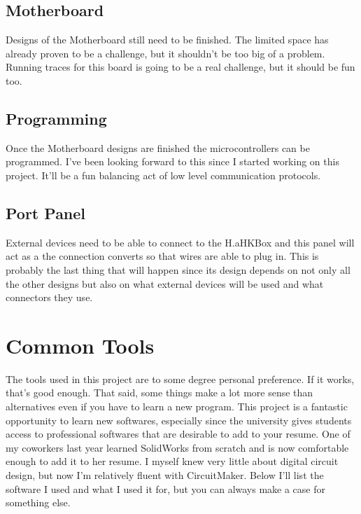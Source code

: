 \documentclass[prb,preprint]{revtex4-1}
\begin{document}
\subsection{Motherboard}
Designs of the Motherboard still need to be finished. The limited space has already proven to be a challenge, but it shouldn't be too big of a problem. Running traces for this board is going to be a real challenge, but it should be fun too.

\subsection{Programming}
Once the Motherboard designs are finished the microcontrollers can be programmed. I've been looking forward to this since I started working on this project. It'll be a fun balancing act of low level communication protocols.

\subsection{Port Panel}
External devices need to be able to connect to the H.aHKBox and this panel will act as a the connection converts so that wires are able to plug in. This is probably the last thing that will happen since its design depends on not only all the other designs but also on what external devices will be used and what connectors they use.

\section{Common Tools}
The tools used in this project are to some degree personal preference. If it works, that's good enough. That said, some things make a lot more sense than alternatives even if you have to learn a new program. This project is a fantastic opportunity to learn new softwares, especially since the university gives students access to professional softwares that are desirable to add to your resume. One of my coworkers last year learned SolidWorks from scratch and is now comfortable enough to add it to her resume. I myself knew very little about digital circuit design, but now I'm relatively fluent with CircuitMaker. Below I'll list the software I used and what I used it for, but you can always make a case for something else.
\end{document}
